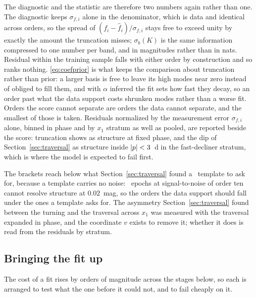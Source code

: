 \documentclass[11pt]{article}
\theoremstyle{plain}
\begin{document}
The diagnostic and the statistic are therefore two numbers again rather than one. The
diagnostic keeps $\sigma_{f,i}$ alone in the denominator, which is data and identical
across orders, so the spread of $(f_{i} - \hat f_{i})/\sigma_{f,i}$ stays free to exceed
unity by exactly the amount the truncation misses; $\sigma_{b}(K)$ is the same information
compressed to one number per band, and in magnitudes rather than in nats. Residual within the training
sample falls with either order by construction and so ranks nothing. \eqref{eq:coefprior}
is what keeps the comparison about truncation rather than prior: a larger basis is free to
leave its high modes near zero instead of obliged to fill them, and with $\alpha$ inferred
the fit sets how fast they decay, so an order past what the data support costs shrunken
modes rather than a worse fit. Orders the score cannot separate are orders
the data cannot separate, and the smallest of those is taken. Residuals normalized by the
measurement error $\sigma_{f,i}$ alone, binned in phase and by $x_{1}$ stratum as well as
pooled, are reported beside the score: truncation shows as structure at fixed phase, and
the dip of Section~\ref{sec:traversal} as structure inside $|p| < 3$~d in the
fast-decliner stratum, which is where the model is expected to fail first.

The brackets reach below what Section~\ref{sec:traversal} found a \salt\ template to ask
for, because a template carries no noise: \ztf\ epochs at signal-to-noise of order ten
cannot resolve structure at $0.02$~mag, so the orders the data support should fall under
the ones a template asks for. The asymmetry Section~\ref{sec:traversal} found between the
turning and the traversal across $x_{1}$ was measured with the traversal expanded in phase,
and the coordinate $v$ exists to remove it; whether it does is read from the residuals by
stratum.

\subsection{Bringing the fit up}
\label{sec:staging}

The cost of a fit rises by orders of magnitude across the stages below, so each is arranged
to test what the one before it could not, and to fail cheaply on it.
\end{document}
